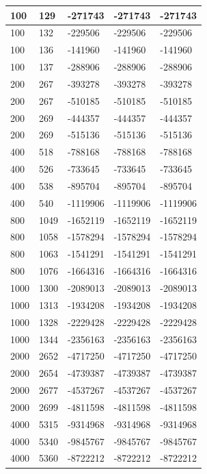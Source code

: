 \begin{longtable}[H]{|p{1.5cm}|p{1.5cm}|p{2cm}|p{3cm}|p{4cm}|}
    100 & 129 & -271743 & -271743 & -271743 \\ \hline
    100 & 132 & -229506 & -229506 & -229506 \\ \hline
    100 & 136 & -141960 & -141960 & -141960 \\ \hline
    100 & 137 & -288906 & -288906 & -288906 \\ \hline
    200 & 267 & -393278 & -393278 & -393278 \\ \hline
    200 & 267 & -510185 & -510185 & -510185 \\ \hline
    200 & 269 & -444357 & -444357 & -444357 \\ \hline
    200 & 269 & -515136 & -515136 & -515136 \\ \hline
    400 & 518 & -788168 & -788168 & -788168 \\ \hline
    400 & 526 & -733645 & -733645 & -733645 \\ \hline
    400 & 538 & -895704 & -895704 & -895704 \\ \hline
    400 & 540 & -1119906 & -1119906 & -1119906 \\ \hline
    800 & 1049 & -1652119 & -1652119 & -1652119 \\ \hline 
    800 & 1058 & -1578294 & -1578294 & -1578294 \\ \hline 
    800 & 1063 & -1541291 & -1541291 & -1541291 \\ \hline
    800 & 1076 & -1664316 & -1664316 & -1664316 \\ \hline
    1000 & 1300 & -2089013 & -2089013 & -2089013 \\ \hline
    1000 & 1313 & -1934208 & -1934208 & -1934208 \\ \hline
    1000 & 1328 & -2229428 & -2229428 & -2229428 \\ \hline
    1000 & 1344 & -2356163 & -2356163 & -2356163 \\ \hline
    2000 & 2652 & -4717250 & -4717250 & -4717250 \\ \hline
    2000 & 2654 & -4739387 & -4739387 & -4739387 \\ \hline 
    2000 & 2677 & -4537267 & -4537267 & -4537267 \\ \hline 
    2000 & 2699 & -4811598 & -4811598 & -4811598 \\ \hline 
    4000 & 5315 & -9314968 & -9314968 & -9314968 \\ \hline
    4000 & 5340 & -9845767 & -9845767 & -9845767 \\ \hline
    4000 & 5360 & -8722212 & -8722212 & -8722212 \\ \hline

\end{longtable}
